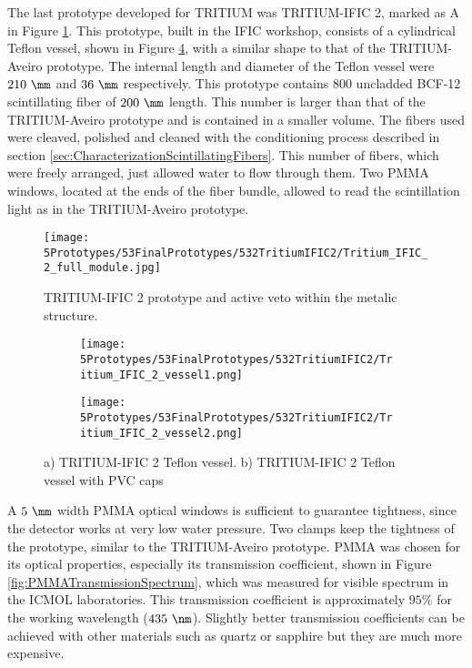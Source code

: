 The last prototype developed for TRITIUM was TRITIUM-IFIC 2, marked as A in Figure \ref{fig:TritiumIFIC2}. This prototype, built in the IFIC workshop, consists of a cylindrical Teflon vessel, shown in Figure \ref{fig:Tritium-IFIC2_vessels}, with a similar shape to that of the TRITIUM-Aveiro prototype. The internal length and diameter of the Teflon vessel were $210~\mm$ and $36~\mm$ respectively. This prototype contains $800$ uncladded BCF-12 scintillating fiber of $200~\mm$ length. This number is larger than that of the TRITIUM-Aveiro prototype and is contained in a smaller volume. The fibers used were cleaved, polished and cleaned with the conditioning process described in section \ref{sec:CharacterizationScintillatingFibers}. This number of fibers, which were freely arranged, just allowed water to flow through them. Two PMMA windows, located at the ends of the fiber bundle, allowed to read the scintillation light as in the TRITIUM-Aveiro prototype. 

\begin{figure}[h]
\centering
\texttt{[image: 5Prototypes/53FinalPrototypes/532TritiumIFIC2/Tritium\_IFIC\_2\_full\_module.jpg]}
\caption{TRITIUM-IFIC 2 prototype and active veto within the metalic structure.\label{fig:TritiumIFIC2}}
\end{figure}

\begin{figure}
\centering
    \begin{subfigure}[b]{0.35\textwidth}
    \centering
    \texttt{[image: 5Prototypes/53FinalPrototypes/532TritiumIFIC2/Tritium\_IFIC\_2\_vessel1.png]}  
    \caption{\label{subfig:Tritium_IFIC_2_vessel}}
    \end{subfigure}
    \hfill
    \begin{subfigure}[b]{0.3\textwidth}
    \centering
    \texttt{[image: 5Prototypes/53FinalPrototypes/532TritiumIFIC2/Tritium\_IFIC\_2\_vessel2.png]}  
    \caption{\label{subfig:TritiumIFIC2_vessel_with_PVC_caps}}
    \end{subfigure}
 \caption{a) TRITIUM-IFIC 2 Teflon vessel. b) TRITIUM-IFIC 2 Teflon vessel with PVC caps}
 \label{fig:Tritium-IFIC2_vessels}
\end{figure}

A $5~\mm$ width PMMA optical windows is sufficient to guarantee tightness, since the detector works at very low water pressure. Two clamps keep the tightness of the prototype, similar to the TRITIUM-Aveiro prototype. PMMA was chosen for its optical properties, especially its transmission coefficient, shown in Figure \ref{fig:PMMATransmissionSpectrum}, which was measured for visible spectrum in the ICMOL laboratories. This transmission coefficient is approximately $95\%$ for the working wavelength ($435~\nm$). Slightly better transmission coefficients can be achieved with other materials such as quartz or sapphire but they are much more expensive.

